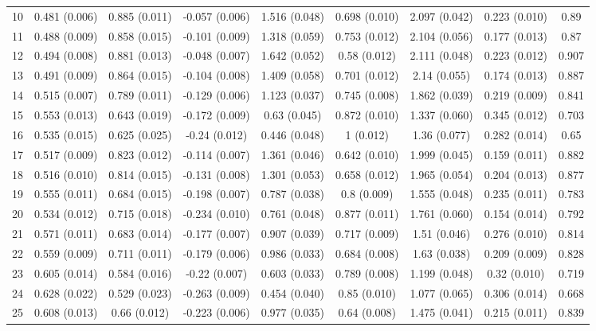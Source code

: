 \begin{tabular}{@{\extracolsep{5pt}} l cccccccc}
10 & 0.481 (0.006) & 0.885 (0.011) & -0.057 (0.006) & 1.516 (0.048) & 0.698 (0.010) & 2.097 (0.042) & 0.223 (0.010) & 0.89 \\ 
11 & 0.488 (0.009) & 0.858 (0.015) & -0.101 (0.009) & 1.318 (0.059) & 0.753 (0.012) & 2.104 (0.056) & 0.177 (0.013) & 0.87 \\ 
12 & 0.494 (0.008) & 0.881 (0.013) & -0.048 (0.007) & 1.642 (0.052) & 0.58 (0.012) & 2.111 (0.048) & 0.223 (0.012) & 0.907 \\ 
13 & 0.491 (0.009) & 0.864 (0.015) & -0.104 (0.008) & 1.409 (0.058) & 0.701 (0.012) & 2.14 (0.055) & 0.174 (0.013) & 0.887 \\ 
14 & 0.515 (0.007) & 0.789 (0.011) & -0.129 (0.006) & 1.123 (0.037) & 0.745 (0.008) & 1.862 (0.039) & 0.219 (0.009) & 0.841 \\ 
15 & 0.553 (0.013) & 0.643 (0.019) & -0.172 (0.009) & 0.63 (0.045) & 0.872 (0.010) & 1.337 (0.060) & 0.345 (0.012) & 0.703 \\ 
16 & 0.535 (0.015) & 0.625 (0.025) & -0.24 (0.012) & 0.446 (0.048) & 1 (0.012) & 1.36 (0.077) & 0.282 (0.014) & 0.65 \\ 
17 & 0.517 (0.009) & 0.823 (0.012) & -0.114 (0.007) & 1.361 (0.046) & 0.642 (0.010) & 1.999 (0.045) & 0.159 (0.011) & 0.882 \\ 
18 & 0.516 (0.010) & 0.814 (0.015) & -0.131 (0.008) & 1.301 (0.053) & 0.658 (0.012) & 1.965 (0.054) & 0.204 (0.013) & 0.877 \\ 
19 & 0.555 (0.011) & 0.684 (0.015) & -0.198 (0.007) & 0.787 (0.038) & 0.8 (0.009) & 1.555 (0.048) & 0.235 (0.011) & 0.783 \\ 
20 & 0.534 (0.012) & 0.715 (0.018) & -0.234 (0.010) & 0.761 (0.048) & 0.877 (0.011) & 1.761 (0.060) & 0.154 (0.014) & 0.792 \\ 
21 & 0.571 (0.011) & 0.683 (0.014) & -0.177 (0.007) & 0.907 (0.039) & 0.717 (0.009) & 1.51 (0.046) & 0.276 (0.010) & 0.814 \\ 
22 & 0.559 (0.009) & 0.711 (0.011) & -0.179 (0.006) & 0.986 (0.033) & 0.684 (0.008) & 1.63 (0.038) & 0.209 (0.009) & 0.828 \\ 
23 & 0.605 (0.014) & 0.584 (0.016) & -0.22 (0.007) & 0.603 (0.033) & 0.789 (0.008) & 1.199 (0.048) & 0.32 (0.010) & 0.719 \\ 
24 & 0.628 (0.022) & 0.529 (0.023) & -0.263 (0.009) & 0.454 (0.040) & 0.85 (0.010) & 1.077 (0.065) & 0.306 (0.014) & 0.668 \\ 
25 & 0.608 (0.013) & 0.66 (0.012) & -0.223 (0.006) & 0.977 (0.035) & 0.64 (0.008) & 1.475 (0.041) & 0.215 (0.011) & 0.839 \\ 

\end{tabular}
